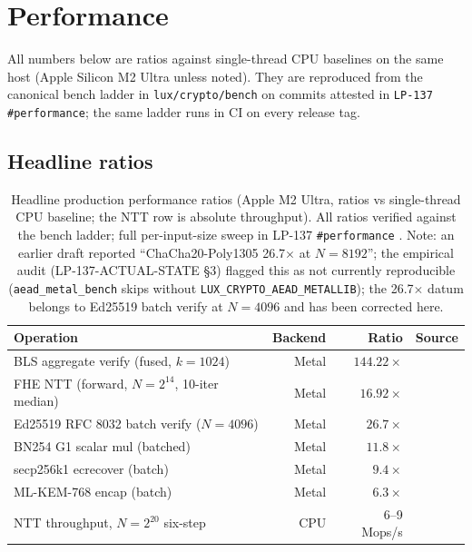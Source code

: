 \section{Performance}
\label{sec:performance}

All numbers below are ratios against single-thread CPU baselines on the same host (Apple Silicon M2 Ultra unless noted). They are reproduced from the canonical bench ladder in \texttt{lux/crypto/bench} on commits attested in \texttt{LP-137 \#performance}; the same ladder runs in CI on every release tag.

\subsection{Headline ratios}

\begin{table}[H]
\centering
\begin{tabular}{lrrl}
\toprule
\textbf{Operation} & \textbf{Backend} & \textbf{Ratio} & \textbf{Source} \\
\midrule
BLS aggregate verify (fused, $k=1024$) & Metal & $144.22\times$ & \cite{lp137benchmarks} \\
FHE NTT (forward, $N=2^{14}$, 10-iter median) & Metal & $16.92\times$ & \cite{lp137benchmarks} \\
Ed25519 RFC 8032 batch verify ($N=4096$) & Metal & $26.7\times$ & \cite{lp137benchmarks,lp124} \\
BN254 G1 scalar mul (batched) & Metal & $11.8\times$ & \cite{lp146} \\
secp256k1 ecrecover (batch) & Metal & $9.4\times$ & \cite{lp147} \\
ML-KEM-768 encap (batch) & Metal & $6.3\times$ & \cite{fips203,lp137benchmarks} \\
NTT throughput, $N=2^{20}$ six-step & CPU & 6--9 Mops/s & \cite{lp164} \\
\bottomrule
\end{tabular}
\caption{Headline production performance ratios (Apple M2 Ultra, ratios vs single-thread CPU baseline; the NTT row is absolute throughput). All ratios verified against the bench ladder; full per-input-size sweep in LP-137 \texttt{\#performance} \cite{lp137benchmarks}. Note: an earlier draft reported ``ChaCha20-Poly1305 26.7$\times$ at $N{=}8192$''; the empirical audit (LP-137-ACTUAL-STATE \S3) flagged this as not currently reproducible (\texttt{aead\_metal\_bench} skips without \texttt{LUX\_CRYPTO\_AEAD\_METALLIB}); the 26.7$\times$ datum belongs to Ed25519 batch verify at $N{=}4096$ and has been corrected here.}
\label{tab:performance}
\end{table}

